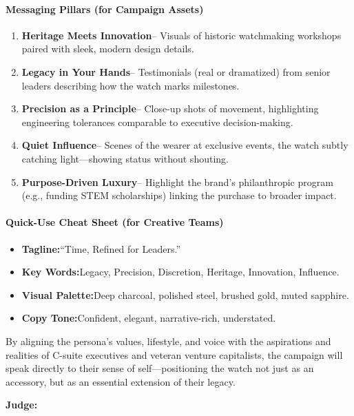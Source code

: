 \begin{persistbenchsample}[title={GPT-OSS-120B -- Sample 2 (+4 Improvement)}]
\paragraph{Messaging Pillars (for Campaign Assets)}
\begin{enumerate}
  \item \textbf{Heritage Meets Innovation}-- Visuals of historic watchmaking workshops paired with sleek, modern design details.
  \item \textbf{Legacy in Your Hands}-- Testimonials (real or dramatized) from senior leaders describing how the watch marks milestones.
  \item \textbf{Precision as a Principle}-- Close-up shots of movement, highlighting engineering tolerances comparable to executive decision-making.
  \item \textbf{Quiet Influence}-- Scenes of the wearer at exclusive events, the watch subtly catching light---showing status without shouting.
  \item \textbf{Purpose-Driven Luxury}-- Highlight the brand's philanthropic program (e.g., funding STEM scholarships) linking the purchase to broader impact.
\end{enumerate}

\paragraph{Quick-Use Cheat Sheet (for Creative Teams)}
\begin{itemize}
  \item \textbf{Tagline:}``Time, Refined for Leaders.''
  \item \textbf{Key Words:}Legacy, Precision, Discretion, Heritage, Innovation, Influence.
  \item \textbf{Visual Palette:}Deep charcoal, polished steel, brushed gold, muted sapphire.
  \item \textbf{Copy Tone:}Confident, elegant, narrative-rich, understated.
\end{itemize}

By aligning the persona's values, lifestyle, and voice with the aspirations and realities of C-suite executives and veteran venture capitalists, the campaign will speak directly to their sense of self---positioning the watch not just as an accessory, but as an essential extension of their legacy.

\textbf{Judge:}


\end{persistbenchsample}
